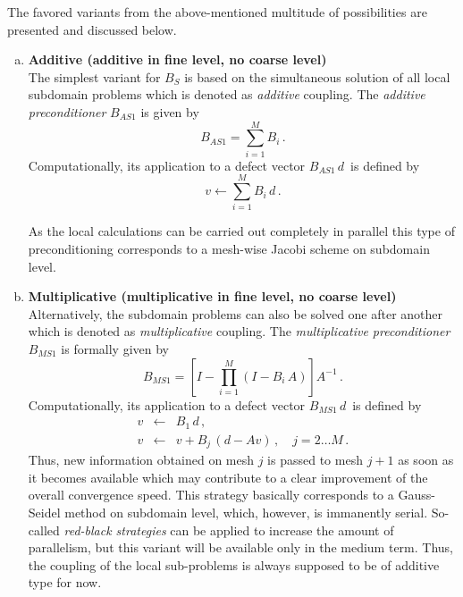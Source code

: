 The favored variants from the above-mentioned multitude of possibilities are presented and discussed below. 


\begin{enumerate}[(a)]
\item{{\bf Additive \ols{} (additive in fine level, no coarse level)}} \\[0.5ex]
The simplest variant for $B_S$ is based on the simultaneous solution of all local subdomain problems which is denoted as {\it additive} coupling. 
The {\it additive \ols{} preconditioner} $B_{AS1}$ is given by
\[B_{AS1} = \sum_{i=1}^M B_i \,. \]
Computationally, its application to a defect vector $B_{AS1}\,d\,$ is defined by 
\[  v \leftarrow \sum_{i=1}^M B_i\, d \,. \]

As the local calculations can be carried out completely in parallel
this type of preconditioning corresponds to a mesh-wise Jacobi scheme on subdomain level.

\item{{\bf Multiplicative \ols{} (multiplicative in fine level, no coarse level)}} \\[0.5ex]
Alternatively, the subdomain problems can also be solved %
one after another which is denoted as {\it multiplicative} coupling. The  
{\it multiplicative \ols{} preconditioner} $B_{MS1}$ is formally given by
\[B_{MS1} = \left[ I - \prod_{i=1}^M (I - B_i\,A)\right] A^{-1}\,. \] 
Computationally, its application to a defect vector $B_{MS1}\,d\,$ is defined by 
\begin{eqnarray*}
v & \leftarrow & B_1\, d                               \,, \\
v & \leftarrow & v + B_j \, (d - Av)\,, \quad j=2 \ldots M\,. 
\end{eqnarray*}
Thus, new information obtained on mesh $j$ is passed to mesh $j+1$ as soon as it becomes available which may contribute to a clear improvement of the overall convergence speed.
This strategy basically corresponds to a Gauss-Seidel method on subdomain level, which, however, is immanently serial. So-called {\it red-black strategies} can be applied to increase the amount of parallelism, but this variant will be available only in the medium term. Thus, the coupling of the local sub-problems is always supposed to be of additive type for now.


\end{enumerate}
